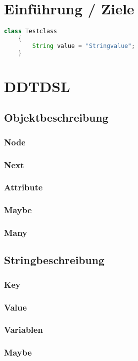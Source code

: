 \documentclass[a4paper,12pt,titlepage]{article}
\begin{document}
\tableofcontents
\newpage
\section{Einführung / Ziele}
\begin{lstlisting}[language=Java, caption={Erster Test}]
	class Testclass
	{
		String value = "Stringvalue";
	}
\end{lstlisting}
\section{DDTDSL}
\subsection{Objektbeschreibung}
\subsubsection{Node}
\subsubsection{Next}
\subsubsection{Attribute}
\subsubsection{Maybe}
\subsubsection{Many}
\subsection{Stringbeschreibung}
\subsubsection{Key}
\subsubsection{Value}
\subsubsection{Variablen}
\subsubsection{Maybe}
\end{document}
